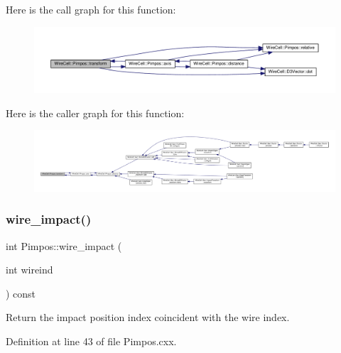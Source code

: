 Here is the call graph for this function\+:
\nopagebreak
\begin{figure}[H]
\begin{center}
\leavevmode
\includegraphics[width=350pt]{class_wire_cell_1_1_pimpos_a0d2db56d6956aee06d0218ee50400f25_cgraph}
\end{center}
\end{figure}
Here is the caller graph for this function\+:
\nopagebreak
\begin{figure}[H]
\begin{center}
\leavevmode
\includegraphics[width=350pt]{class_wire_cell_1_1_pimpos_a0d2db56d6956aee06d0218ee50400f25_icgraph}
\end{center}
\end{figure}
\mbox{\label{class_wire_cell_1_1_pimpos_ae91d0c7565196dba1fbf9bd83760d25e}} 
\subsubsection{\texorpdfstring{wire\+\_\+impact()}{wire\_impact()}}
{\footnotesize\ttfamily int Pimpos\+::wire\+\_\+impact (\begin{DoxyParamCaption}\item[{int}]{wireind }\end{DoxyParamCaption}) const}



Return the impact position index coincident with the wire index. 



Definition at line 43 of file Pimpos.\+cxx.

